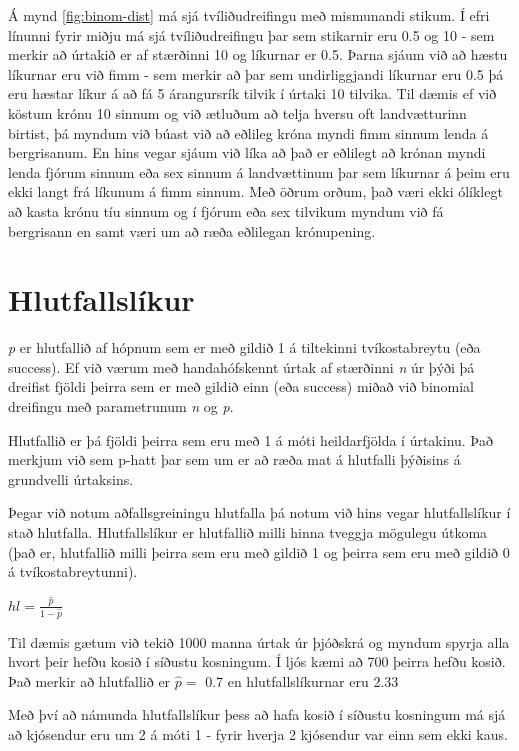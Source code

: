 \documentclass[]{book}
\begin{document}
Á mynd \ref{fig:binom-dist} má sjá tvíliðudreifingu með mismunandi stikum. Í efri línunni fyrir miðju má sjá tvíliðudreifingu þar sem stikarnir eru 0.5 og 10 - sem merkir að úrtakið er af stærðinni 10 og líkurnar er 0.5. Þarna sjáum við að hæstu líkurnar eru við fimm - sem merkir að þar sem undirliggjandi líkurnar eru 0.5 þá eru hæstar líkur á að fá 5 árangursrík tilvik í úrtaki 10 tilvika. Til dæmis ef við köstum krónu 10 sinnum og við ætluðum að telja hversu oft landvætturinn birtist, þá myndum við búast við að eðlileg króna myndi fimm sinnum lenda á bergrisanum. En hins vegar sjáum við líka að það er eðlilegt að krónan myndi lenda fjórum sinnum eða sex sinnum á landvættinum þar sem líkurnar á þeim eru ekki langt frá líkunum á fimm sinnum. Með öðrum orðum, það væri ekki ólíklegt að kasta krónu tíu sinnum og í fjórum eða sex tilvikum myndum við fá bergrisann en samt væri um að ræða eðlilegan krónupening.

\hypertarget{hl-likur}{%
\section{Hlutfallslíkur}\label{hl-likur}}

\emph{p} er hlutfallið af hópnum sem er með gildið 1 á tiltekinni tvíkostabreytu (eða success). Ef við værum með handahófskennt úrtak af stærðinni \emph{n} úr þýði þá dreifist fjöldi þeirra sem er með gildið einn (eða success) miðað við binomial dreifingu með parametrunum \emph{n} og \emph{p}.

Hlutfallið er þá fjöldi þeirra sem eru með 1 á móti heildarfjölda í úrtakinu. Það merkjum við sem p-hatt þar sem um er að ræða mat á hlutfalli þýðisins á grundvelli úrtaksins.

Þegar við notum aðfallsgreiningu hlutfalla þá notum við hins vegar hlutfallslíkur í stað hlutfalla. Hlutfallslíkur er hlutfallið milli hinna tveggja mögulegu útkoma (það er, hlutfallið milli þeirra sem eru með gildið 1 og þeirra sem eru með gildið 0 á tvíkostabreytunni).

\(hl=\frac{\hat{p} }{1-\hat{p}}\)

Til dæmis gætum við tekið 1000 manna úrtak úr þjóðskrá og myndum spyrja alla hvort þeir hefðu kosið í síðustu kosningum. Í ljós kæmi að 700 þeirra hefðu kosið. Það merkir að hlutfallið er \(\hat{p}=\) 0.7 en hlutfallslíkurnar eru 2.33

Með því að námunda hlutfallslíkur þess að hafa kosið í síðustu kosningum má sjá að kjósendur eru um 2 á móti 1 - fyrir hverja 2 kjósendur var einn sem ekki kaus.
\end{document}
